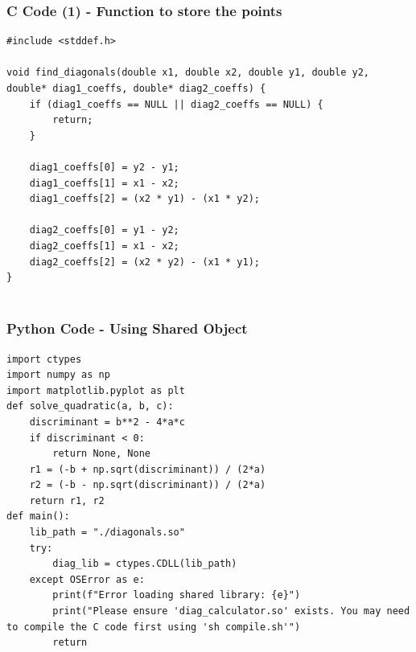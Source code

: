 \documentclass{beamer}
\begin{document}
\begin{frame}[fragile]
    \frametitle{C Code (1) - Function to store the points }

    \begin{lstlisting}
#include <stddef.h>

void find_diagonals(double x1, double x2, double y1, double y2, double* diag1_coeffs, double* diag2_coeffs) {
    if (diag1_coeffs == NULL || diag2_coeffs == NULL) {
        return;
    }

    diag1_coeffs[0] = y2 - y1;
    diag1_coeffs[1] = x1 - x2;
    diag1_coeffs[2] = (x2 * y1) - (x1 * y2);

    diag2_coeffs[0] = y1 - y2;
    diag2_coeffs[1] = x1 - x2;
    diag2_coeffs[2] = (x2 * y2) - (x1 * y1);
}


    \end{lstlisting}
\end{frame}

\begin{frame}[fragile]
    \frametitle{Python Code - Using Shared Object}
    \begin{lstlisting}
import ctypes
import numpy as np
import matplotlib.pyplot as plt
def solve_quadratic(a, b, c):
    discriminant = b**2 - 4*a*c
    if discriminant < 0:
        return None, None
    r1 = (-b + np.sqrt(discriminant)) / (2*a)
    r2 = (-b - np.sqrt(discriminant)) / (2*a)
    return r1, r2
def main():
    lib_path = "./diagonals.so"
    try:
        diag_lib = ctypes.CDLL(lib_path)
    except OSError as e:
        print(f"Error loading shared library: {e}")
        print("Please ensure 'diag_calculator.so' exists. You may need to compile the C code first using 'sh compile.sh'")
        return
\end{lstlisting}
\end{frame}
\end{document}
